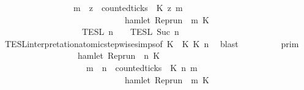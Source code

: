 \begin{isabellebody}
\ \ \ \ \ \ \ \ \ \ \ \ \ \ \ \ \ {\isacharparenleft}{\isasymforall}m\ {\isasymge}\ z{\isachardot}\ \ counted{\isacharunderscore}ticks\ {\isasymrho}\ K\ z\ m\ {}\isanewline
\ \ \ \ \ \ \ \ \ \ \ \ \ \ \ \ \ \ \ \ \ \ \ \ \ \ \ \ {\isasymlongrightarrow}\ hamlet\ {\isacharparenleft}{\isacharparenleft}Rep{\isacharunderscore}run\ {\isasymrho}{\isacharparenright}\ m\ K\ {\isacharbraceright}\isanewline
\ \ \ \ \ \ \ \ \ \ \ \ \ \ \ \ {\isasyminter}\ {\isasymlbrakk}{\isasymlbrakk}\ {\isasymPsi}\ {\isasymrbrakk}{\isasymrbrakk}\isactrlsub T\isactrlsub E\isactrlsub S\isactrlsub L\isactrlbsup {\isasymge}\ n\isactrlesup \ {\isasyminter}\ {\isasymlbrakk}{\isasymlbrakk}\ {\isasymPhi}\ {\isasymrbrakk}{\isasymrbrakk}\isactrlsub T\isactrlsub E\isactrlsub S\isactrlsub L\isactrlbsup {\isasymge}\ Suc\ n\isactrlesup {\isacartoucheclose}\isanewline
\ \ \ \ \isamarkupfalse%
\ TESL{\isacharunderscore}interpretation{\isacharunderscore}atomic{\isacharunderscore}stepwise{\isachardot}simps{\isacharparenleft}{}{\isacharparenright}{\isacharbrackleft}of\ {\isacartoucheopen}K\ {\isacartoucheopen}{}{\isacartoucheclose}\ {\isacartoucheopen}K\ {\isacartoucheopen}K\ {\isacartoucheopen}n{\isacartoucheclose}{\isacharbrackright}\ \isamarkupfalse%
\ blast\isanewline
\ \ \isamarkupfalse%
\ \isamarkupfalse%
\ {\isacartoucheopen}{\isachardot}{\isachardot}{\isachardot}\ {\isacharequal}\ {\isasymlbrakk}{\isasymlbrakk}\ {\isasymGamma}\ {\isasymrbrakk}{\isasymrbrakk}\isactrlsub p\isactrlsub r\isactrlsub i\isactrlsub m\isanewline
\ \ \ \ \ \ \ \ \ \ \ \ \ \ \ \ {\isasyminter}\ {\isacharbraceleft}{\isasymrho}{\isachardot}\ hamlet\ {\isacharparenleft}{\isacharparenleft}Rep{\isacharunderscore}run\ {\isasymrho}{\isacharparenright}\ n\ K\ {\isasymlongrightarrow}\isanewline
\ \ \ \ \ \ \ \ \ \ \ \ \ \ \ \ \ \ \ \ {\isacharparenleft}{\isasymforall}m\ {\isasymge}\ n{\isachardot}\ \ counted{\isacharunderscore}ticks\ {\isasymrho}\ K\ n\ m\ {}\isanewline
\ \ \ \ \ \ \ \ \ \ \ \ \ \ \ \ \ \ \ \ \ \ \ \ \ \ \ \ {\isasymlongrightarrow}\ hamlet\ {\isacharparenleft}{\isacharparenleft}Rep{\isacharunderscore}run\ {\isasymrho}{\isacharparenright}\ m\ K\ {\isacharbraceright}\isanewline

\end{isabellebody}
